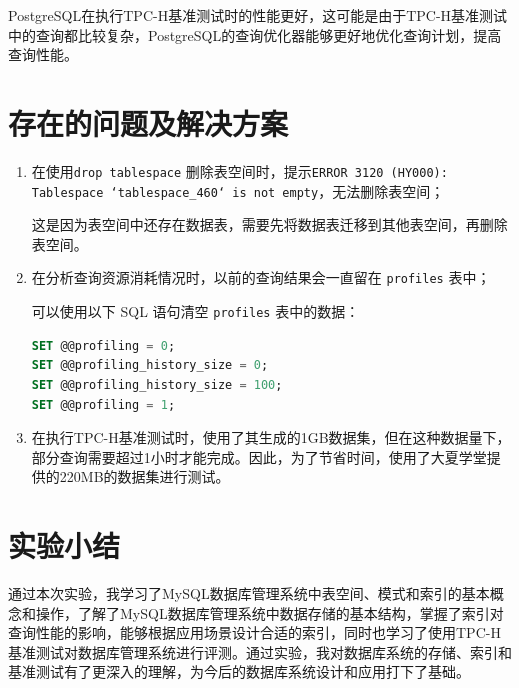 \documentclass{article}
\renewcommand\tt{\texttt}
\begin{document}
PostgreSQL在执行TPC-H基准测试时的性能更好，这可能是由于TPC-H基准测试中的查询都比较复杂，PostgreSQL的查询优化器能够更好地优化查询计划，提高查询性能。


\section{存在的问题及解决方案}

\begin{enumerate}
  \item 在使用\tt{drop tablespace} 删除表空间时，提示\tt{ERROR 3120 (HY000): Tablespace `tablespace\_460` is not empty}，无法删除表空间；
  
  这是因为表空间中还存在数据表，需要先将数据表迁移到其他表空间，再删除表空间。

  \item 在分析查询资源消耗情况时，以前的查询结果会一直留在 \tt{profiles} 表中；
  
  可以使用以下 SQL 语句清空 \tt{profiles} 表中的数据：

  \begin{lstlisting}[language=sql]
SET @@profiling = 0;
SET @@profiling_history_size = 0;
SET @@profiling_history_size = 100; 
SET @@profiling = 1;
  \end{lstlisting}

  \item 在执行TPC-H基准测试时，使用了其生成的1GB数据集，但在这种数据量下，部分查询需要超过1小时才能完成。因此，为了节省时间，使用了大夏学堂提供的220MB的数据集进行测试。
\end{enumerate}


\section{实验小结}

通过本次实验，我学习了MySQL数据库管理系统中表空间、模式和索引的基本概念和操作，了解了MySQL数据库管理系统中数据存储的基本结构，掌握了索引对查询性能的影响，能够根据应用场景设计合适的索引，同时也学习了使用TPC-H基准测试对数据库管理系统进行评测。通过实验，我对数据库系统的存储、索引和基准测试有了更深入的理解，为今后的数据库系统设计和应用打下了基础。
\end{document}
